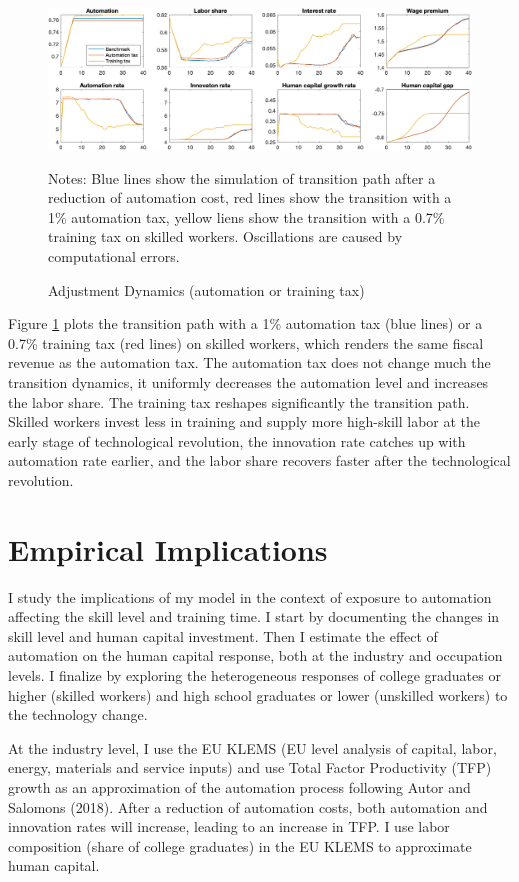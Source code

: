 \documentclass[12pt]{article}
\begin{document}
\begin{figure}[h!]
\includegraphics[width=\textwidth]{Transition3}
\caption{Adjustment Dynamics (automation or training tax)}
\label{transition3}
{\scriptsize Notes: Blue lines show the simulation of transition path after a reduction of automation cost, red lines show the transition with a 1\% automation tax, yellow liens show the transition with a 0.7\% training tax on skilled workers. Oscillations are caused by computational errors.}
\end{figure}

Figure \ref{transition3} plots the transition path with a 1\% automation tax (blue lines) or a 0.7\% training tax (red lines) on skilled workers, which renders the same fiscal revenue as the automation tax. The automation tax does not change much the transition dynamics, it uniformly decreases the automation level and increases the labor share. The training tax reshapes significantly the transition path. Skilled workers invest less in training and supply more high-skill labor at the early stage of technological revolution, the innovation rate catches up with automation rate earlier, and the labor share recovers faster after the technological revolution. 

\section{Empirical Implications}
I study the implications of my model in the context of exposure to automation affecting the skill level and training time. I start by documenting the changes in skill level and human capital investment. Then I estimate the effect of automation on the human capital response, both at the industry and occupation levels. I finalize by exploring the heterogeneous responses of college graduates or higher (skilled workers) and high school graduates or lower (unskilled workers) to the technology change. 

At the industry level, I use the EU KLEMS (EU level analysis of capital, labor, energy, materials and service inputs) and use Total Factor Productivity (TFP) growth as an approximation of the automation process following Autor and Salomons (2018)\nocite{AutorSalomons2018}. After a reduction of automation costs, both automation and innovation rates will increase, leading to an increase in TFP. I use labor composition (share of college graduates) in the EU KLEMS to approximate human capital. 
\end{document}
